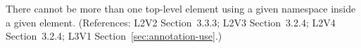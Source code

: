 There cannot be more than one top-level element using a given namespace
inside a given  element.  (References: L2V2 Section~3.3.3;
L2V3 Section~3.2.4; L2V4 Section~3.2.4; L3V1 Section~\ref{sec:annotation-use}.)

